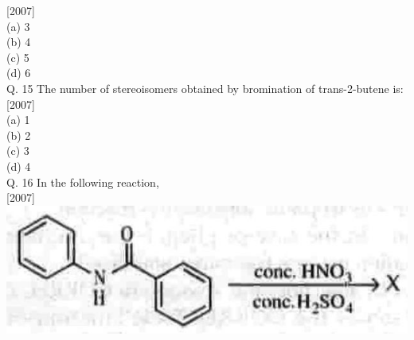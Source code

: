 \documentclass[10pt]{article}
\begin{document}
[2007]\\
(a) 3\\
(b) 4\\
(c) 5\\
(d) 6\\
Q. 15 The number of stereoisomers obtained by bromination of trans-2-butene is:\\[0pt]
[2007]\\
(a) 1\\
(b) 2\\
(c) 3\\
(d) 4\\
Q. 16 In the following reaction,\\[0pt]
[2007]\\
\includegraphics[max width=\textwidth, center]{2025_01_28_8470952b98110cec3aabg-154(1)}
\end{document}
